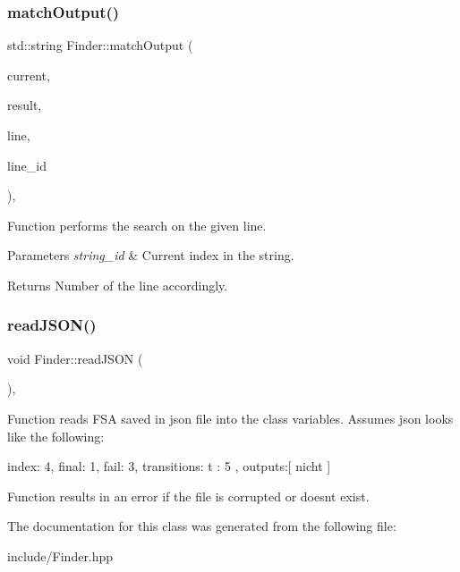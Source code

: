 \subsubsection{\texorpdfstring{match\+Output()}{matchOutput()}}
{\footnotesize\ttfamily std\+::string Finder\+::match\+Output (\begin{DoxyParamCaption}\item[{int}]{current,  }\item[{std\+::string}]{result,  }\item[{std\+::string}]{line,  }\item[{int}]{line\+\_\+id }\end{DoxyParamCaption})\hspace{0.3cm}{\ttfamily [inline]}, {\ttfamily [private]}}

Function performs the search on the given line.


\begin{DoxyParams}{Parameters}
{\em string\+\_\+id} & Current index in the string. \\
\hline
\end{DoxyParams}
\begin{DoxyReturn}{Returns}
Number of the line accordingly. 
\end{DoxyReturn}
\mbox{\label{classFinder_a21b8b64fb105f001ddb72a019389a764}} 
\subsubsection{\texorpdfstring{read\+J\+S\+O\+N()}{readJSON()}}
{\footnotesize\ttfamily void Finder\+::read\+J\+S\+ON (\begin{DoxyParamCaption}{ }\end{DoxyParamCaption})\hspace{0.3cm}{\ttfamily [inline]}, {\ttfamily [private]}}

Function reads F\+SA saved in json file into the class variables. Assumes json looks like the following\+: \begin{DoxyVerb}      index: 4,
      final: 1,
      fail:  3,
      transitions:{
      t : 5
      },
      outputs:[
      nicht
      ]
\end{DoxyVerb}
 Function results in an error if the file is corrupted or doesn\textquotesingle{}t exist. 

The documentation for this class was generated from the following file\+:\begin{DoxyCompactItemize}
\item 
include/Finder.\+hpp\end{DoxyCompactItemize}

